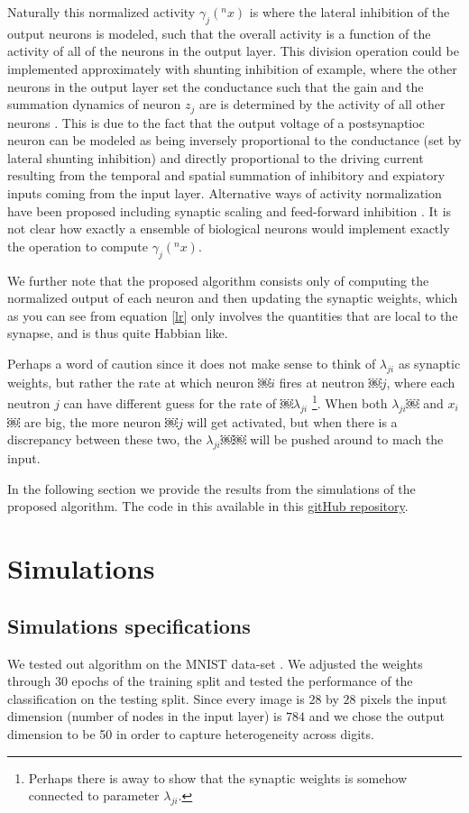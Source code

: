 \documentclass{article}
\begin{document}
Naturally this normalized activity \(\gamma_j(^nx)\) is where the
lateral inhibition of the output neurons is modeled, such that the overall
activity is a function of the activity of all of the neurons in the
output layer. This division operation could be implemented approximately
with shunting inhibition of example, where the other neurons in the
output layer set the conductance such that the gain and the summation
dynamics of neuron \(z_j\) are is determined by the activity of all
other neurons \cite{carandini1994}. This is due to the fact
that the output voltage of a postsynaptioc neuron can be modeled as
being inversely proportional to the conductance (set by lateral shunting
inhibition) and directly proportional to the driving current resulting
from the temporal and spatial summation of inhibitory and expiatory
inputs coming from the input layer. Alternative ways of activity
normalization have been proposed including synaptic scaling and
feed-forward inhibition \cite{carandini2012} \cite{pouille2009}. It is not
clear how exactly a ensemble of biological neurons would implement exactly the
operation to compute \(\gamma_j(^nx)\).

We further note that the proposed algorithm consists only of computing
the normalized output of each neuron and then updating the synaptic
weights, which as you can see from equation \eqref{lr}
only involves the quantities that are local to the synapse, and is thus quite
Habbian like. 

Perhaps a word of caution since it does not make
sense to think of \(\lambda_{ji}\) as synaptic weights, but rather the rate at which neuron ￼$i$ fires at neutron ￼$j$,
where each neutron $j$ can have different guess for the rate of ￼\(\lambda_{ji}\) \footnote{Perhaps there is away to show that the synaptic weights is somehow connected to parameter \(\lambda_{ji}\).}. When both \(\lambda_{ji}\)￼ and $x_i$￼ are big, the more neuron ￼$j$ will get activated, but when there is a discrepancy between these two, the \(\lambda_{ji}\)￼￼ will be pushed around to mach the input. 

In the following section we provide the results from the simulations of the proposed algorithm. The code in this available in this \href{https://github.com/Sann5/neural_populations}{\color{draculacyan} gitHub repository}. 

\section{Simulations}
\subsection{Simulations specifications}
We tested out algorithm on the MNIST data-set \cite{deng2012mnist}. We adjusted the weights through 30 epochs of the training split and tested the performance of the classification on the testing split. Since every image is $28$ by $28$ pixels the input dimension (number of nodes in the input layer) is $784$ and we chose the output dimension to be 50 in order to capture heterogeneity across digits. 
\end{document}

